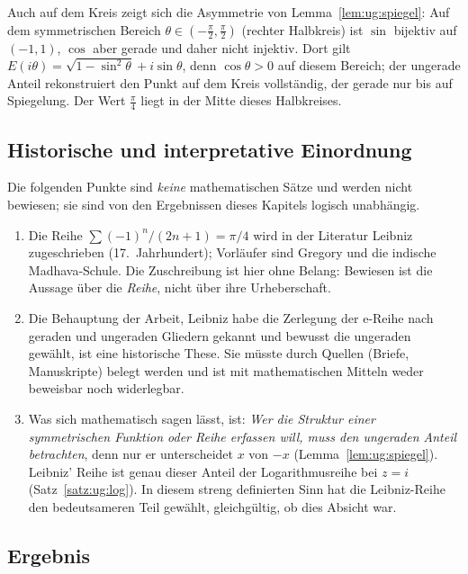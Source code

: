 \begin{bemerkung}[Halbkreis]
Auch auf dem Kreis zeigt sich die Asymmetrie von Lemma~\ref{lem:ug:spiegel}: Auf dem symmetrischen Bereich $\theta\in(-\frac\pi2,\frac\pi2)$ (rechter Halbkreis) ist $\sin$ bijektiv auf $(-1,1)$, $\cos$ aber gerade und daher nicht injektiv. Dort gilt $E(i\theta)=\sqrt{1-\sin^2\theta}+i\sin\theta$, denn $\cos\theta>0$ auf diesem Bereich; der ungerade Anteil rekonstruiert den Punkt auf dem Kreis vollständig, der gerade nur bis auf Spiegelung. Der Wert $\frac\pi4$ liegt in der Mitte dieses Halbkreises.
\end{bemerkung}

\subsection{Historische und interpretative Einordnung}
\label{sec:ug:historie}

Die folgenden Punkte sind \emph{keine} mathematischen Sätze und werden nicht bewiesen; sie sind von den Ergebnissen dieses Kapitels logisch unabhängig.

\begin{enumerate}
\item Die Reihe $\sum(-1)^n/(2n+1)=\pi/4$ wird in der Literatur Leibniz zugeschrieben (17.~Jahrhundert); Vorläufer sind Gregory und die indische Madhava-Schule. Die Zuschreibung ist hier ohne Belang: Bewiesen ist die Aussage über die \emph{Reihe}, nicht über ihre Urheberschaft.
\item Die Behauptung der Arbeit, Leibniz habe die Zerlegung der e-Reihe nach geraden und ungeraden Gliedern gekannt und bewusst die ungeraden gewählt, ist eine historische These. Sie müsste durch Quellen (Briefe, Manuskripte) belegt werden und ist mit mathematischen Mitteln weder beweisbar noch widerlegbar.
\item Was sich mathematisch sagen lässt, ist: \emph{Wer die Struktur einer symmetrischen Funktion oder Reihe erfassen will, muss den ungeraden Anteil betrachten}, denn nur er unterscheidet $x$ von $-x$ (Lemma~\ref{lem:ug:spiegel}). Leibniz' Reihe ist genau dieser Anteil der Logarithmusreihe bei $z=i$ (Satz~\ref{satz:ug:log}). In diesem streng definierten Sinn hat die Leibniz-Reihe den bedeutsameren Teil gewählt, gleichgültig, ob dies Absicht war.
\end{enumerate}

\subsection{Ergebnis}
\label{sec:ug:ergebnis}

